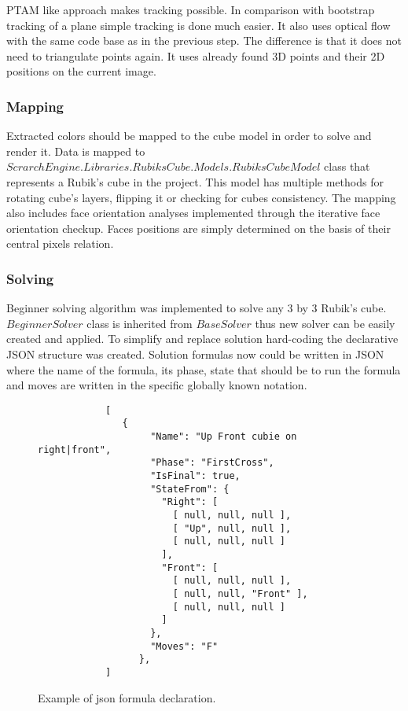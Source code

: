 \documentclass[../../main.tex]{subfiles}
\begin{document}
\ac{PTAM} like approach makes tracking possible. In comparison with bootstrap tracking of a plane simple tracking is done much easier. It also uses optical flow with the same code base as in the previous step. The difference is that it does not need to triangulate points again. It uses already found 3D points and their 2D positions on the current image.

\subsubsection*{Mapping}

Extracted colors should be mapped to the cube model in order to solve and render it. Data is mapped to $ScrarchEngine.Libraries.RubiksCube.Models.RubiksCubeModel$ class that represents a Rubik's cube in the project. This model has multiple methods for rotating cube's layers, flipping it or checking for cubes consistency. The mapping also includes face orientation analyses implemented through the iterative face orientation checkup. Faces positions are simply determined on the basis of their central pixels relation.

\subsubsection*{Solving}

Beginner solving algorithm was implemented to solve any 3 by 3 Rubik's cube. $BeginnerSolver$ class is inherited from $BaseSolver$ thus new solver can be easily created and applied. To simplify and replace solution hard-coding the declarative \ac{JSON} structure was created. Solution formulas now could be written in \ac{JSON} where the name of the formula, its phase, state that should be to run the formula and moves are written in the specific globally known notation.

\begin{figure} [!ht]
  \centering    
    \lstset{style=sharpc}
        \begin{lstlisting}
            [
               {
                    "Name": "Up Front cubie on right|front",
                    "Phase": "FirstCross",
                    "IsFinal": true,
                    "StateFrom": {
                      "Right": [
                        [ null, null, null ],
                        [ "Up", null, null ],
                        [ null, null, null ]
                      ],
                      "Front": [
                        [ null, null, null ],
                        [ null, null, "Front" ],
                        [ null, null, null ]
                      ]
                    },
                    "Moves": "F"
                  },
            ]     
        \end{lstlisting}
  \caption{Example of json formula declaration.}
  \label{jsonsolformuladecl}
\end{figure}
\end{document}
